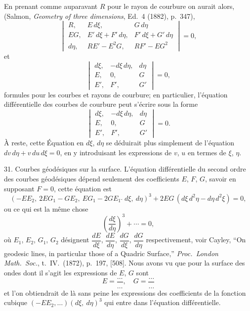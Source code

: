 \documentclass[11pt,a4paper]{book}
\begin{document}
{{{En prenant comme auparavant $R$ pour le rayon de courbure on aurait alors,
(Salmon, \textit{Geometry of three dimensions}, Ed.\ 4 (1882), p.\ 347),
\[
\begin{vmatrix}
R, & E\,d\xi, & G\,d\eta \\
EG, & E'\,d\xi + F'\,d\eta, & F'\,d\xi + G'\,d\eta \\
d\eta, & RE' - E^2G, & RF' - EG^2
\end{vmatrix}
= 0,
\]
et
\[
\begin{vmatrix}
d\xi, & -d\xi\,d\eta, & d\eta \\
E, & 0, & G \\
E', & F', & G'
\end{vmatrix}
= 0,
\]
formules pour les courbes et rayons de courbure; en particulier, l'\'equation diff\'erentielle
des courbes de courbure peut s'\'ecrire sous la forme
\[
\begin{vmatrix}
d\xi, & -d\xi\,d\eta, & d\eta \\
E, & 0, & G \\
E', & F', & G'
\end{vmatrix}
= 0.
\]
\`A reste, cette \'Equation en $d\xi$, $d\eta$ se d\'eduirait plus simplement de l'\'equation
$dv\,d\eta + v\,du\,d\xi = 0$, en y introduisant les expressions de $v$, $u$ en termes de $\xi$, $\eta$.

31. Courbes g\'eod\'esiques sur la surface. L'\'equation diff\'erentielle du second ordre
des courbes g\'eod\'esiques d\'epend seulement des coefficients $E$, $F$, $G$, savoir en supposant
$F=0$, cette \'equation est
\[
(-EE_2,\ 2EG_1 - GE_2,\ EG_1 - 2GE_1\,\breve{\,}\,d\xi,\ d\eta)^3
+ 2EG\,(d\xi\,d^2\eta - d\eta\,d^2\xi) = 0,
\]
ou ce qui est la m\^eme chose
\[
\left(\frac{d\xi}{d\eta}\right)^3 + \cdots = 0,
\]
o\`u $E_1$, $E_2$, $G_1$, $G_2$ d\'esignent $\dfrac{dE}{d\xi}$, $\dfrac{dE}{d\eta}$,
$\dfrac{dG}{d\xi}$, $\dfrac{dG}{d\eta}$ respectivement,
voir Cayley, ``On geodesic lines, in particular those of a Quadric Surface,''
\textit{Proc.\ London Math.\ Soc.}, t.\ IV.\ (1872), p.\ 197, [508].
Nous avons vu que pour la surface des ondes dont il s'agit les expressions de $E$, $G$ sont
\[
E = \frac{\ldots}{\ldots}, \quad G = \frac{\ldots}{\ldots}
\]
et l'on obtiendrait de l\`a sans peine les expressions des coefficients de la fonction
cubique $(-EE_2,\ldots)(d\xi,\ d\eta)^3$ qui entre dans l'\'equation diff\'erentielle.

\newpage

}}}
\end{document}
